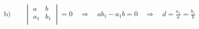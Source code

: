 \documentclass[preview]{standalone}
\begin{document}
\begin{align*}
\text{b)}\qquad\begin{vmatrix} a & b\\ a_1 & b_1\\ \end{vmatrix}=0\quad\Rightarrow\quad ab_1-a_1b=0\quad\Rightarrow\quad d=\frac{a_1}{a}=\frac{b_1}{b}
\end{align*}
\end{document}
